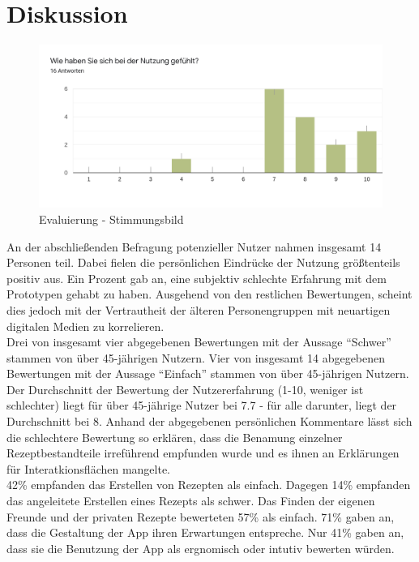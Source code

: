 \chapter{Diskussion}
\label{cha:Diskussion}
\begin{figure}[h] %
    \includegraphics[width=1\textwidth]{images/PersonlichesEmpfinden.png}
    \caption[Evaluierung - Stimmungsbild]{Evaluierung - Stimmungsbild}
    \label{fig:EvaluierungStimmungsbild}
\end{figure}
An der abschließenden Befragung potenzieller Nutzer nahmen insgesamt 14 Personen teil. Dabei fielen die persönlichen Eindrücke der Nutzung größtenteils positiv aus. Ein Prozent gab an, eine subjektiv schlechte Erfahrung mit dem Prototypen gehabt zu haben. Ausgehend von den restlichen Bewertungen, scheint dies jedoch mit der Vertrautheit der älteren Personengruppen mit neuartigen digitalen Medien zu korrelieren.\\ 
Drei von insgesamt vier abgegebenen Bewertungen mit der Aussage {``Schwer''} stammen von über 45-jährigen Nutzern. 
Vier von insgesamt 14 abgegebenen Bewertungen mit der Aussage {``Einfach''} stammen von über 45-jährigen Nutzern. \\
Der Durchschnitt der Bewertung der Nutzererfahrung (1-10, weniger ist schlechter) liegt für über 45-jährige Nutzer bei 7.7 - für alle darunter, liegt der Durchschnitt bei 8. Anhand der abgegebenen persönlichen Kommentare lässt sich die schlechtere Bewertung so erklären, dass die Benamung einzelner Rezeptbestandteile irreführend empfunden wurde und es ihnen an Erklärungen für Interatkionsflächen mangelte.\\

42\% empfanden das Erstellen von Rezepten als einfach. Dagegen 14\% empfanden das angeleitete Erstellen eines Rezepts als schwer. Das Finden der eigenen Freunde und der privaten Rezepte bewerteten 57\% als einfach. 71\% gaben an, dass die Gestaltung der App ihren Erwartungen entspreche. Nur 41\%  gaben an, dass sie die Benutzung der App als ergnomisch oder intutiv bewerten würden. \\

